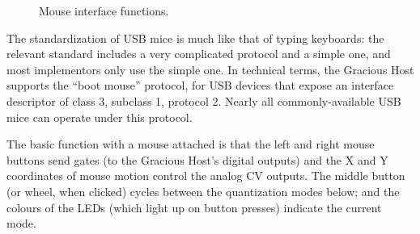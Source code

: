 \begin{figure*}
{\par}
\caption{Mouse interface functions.}\label{fig:mouse-conn}
\end{figure*}

The standardization of USB mice is much like that of typing keyboards:  the
relevant standard includes a very complicated protocol and a simple one, and
most implementors only use the simple one.  In technical terms, the Gracious
Host supports the ``boot mouse'' protocol, for USB devices that expose an
interface descriptor of class 3, subclass 1, protocol 2.  Nearly all
commonly-available USB mice can operate under this protocol.

The basic function with a mouse attached is that the left and right mouse
buttons send gates (to the Gracious Host's digital outputs) and the X and Y
coordinates of mouse motion control the analog CV outputs.  The middle
button (or wheel, when clicked) cycles between the quantization modes below;
and the colours of the LEDs (which light up on button presses) indicate the
current mode.

